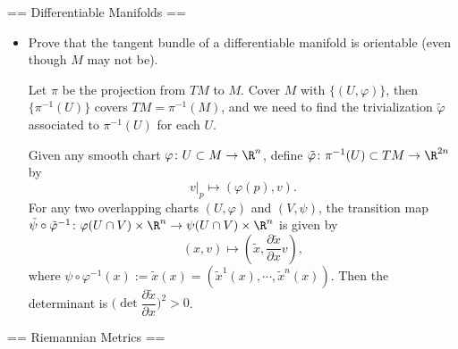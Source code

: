 \setcounter{section}{-1}

== Differentiable Manifolds ==

\begin{itemize}
    \item[2.] Prove that the tangent bundle of a differentiable manifold 
    is orientable (even though $M$ may not be).

    Let $\pi$ be the projection from $TM$ to $M$. 
    Cover $M$ with $\{(U,\varphi)\}$, 
    then $\{\pi^{-1}(U)\}$ covers $TM=\pi^{-1}(M)$, 
    and we need to find the trivialization $\tilde{\varphi}$ 
    associated to $\pi^{-1}(U)$ for each $U$.

    Given any smooth chart $\varphi\colon U\subset M\to\R^n$, 
    define $\tilde{\varphi}\colon \pi^{-1}(U)\subset TM\to\R^{2n}$ by
    \[v|_p \mapsto (\varphi(p),v).\]
    For any two overlapping charts $(U,\varphi)$ and $(V,\psi)$, 
    the transition map $\tilde{\psi}\circ\tilde{\varphi}^{-1}
    \colon \varphi(U\cap V)\times\R^n\to\psi(U\cap V)\times\R^n$ is given by
    \[(x,v)\mapsto(\tilde{x},\frac{\partial\tilde{x}}{\partial x}v),\]
    where $\psi\circ\varphi^{-1}(x):=\tilde{x}(x)
    =(\tilde{x}^1(x),\cdots,\tilde{x}^n(x))$. 
    Then the determinant is $\bigg(\!\det\dfrac{\partial\tilde{x}}{\partial x}\bigg)^2>0$.
\end{itemize}

== Riemannian Metrics ==

